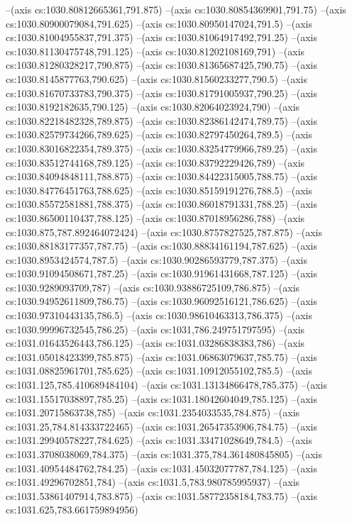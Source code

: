 --(axis cs:1030.80812665361,791.875)
--(axis cs:1030.80854369901,791.75)
--(axis cs:1030.80900079084,791.625)
--(axis cs:1030.80950147024,791.5)
--(axis cs:1030.81004955837,791.375)
--(axis cs:1030.81064917492,791.25)
--(axis cs:1030.81130475748,791.125)
--(axis cs:1030.81202108169,791)
--(axis cs:1030.81280328217,790.875)
--(axis cs:1030.81365687425,790.75)
--(axis cs:1030.8145877763,790.625)
--(axis cs:1030.81560233277,790.5)
--(axis cs:1030.81670733783,790.375)
--(axis cs:1030.81791005937,790.25)
--(axis cs:1030.8192182635,790.125)
--(axis cs:1030.82064023924,790)
--(axis cs:1030.82218482328,789.875)
--(axis cs:1030.82386142474,789.75)
--(axis cs:1030.82579734266,789.625)
--(axis cs:1030.82797450264,789.5)
--(axis cs:1030.83016822354,789.375)
--(axis cs:1030.83254779966,789.25)
--(axis cs:1030.83512744168,789.125)
--(axis cs:1030.83792229426,789)
--(axis cs:1030.84094848111,788.875)
--(axis cs:1030.84422315005,788.75)
--(axis cs:1030.84776451763,788.625)
--(axis cs:1030.85159191276,788.5)
--(axis cs:1030.85572581881,788.375)
--(axis cs:1030.86018791331,788.25)
--(axis cs:1030.86500110437,788.125)
--(axis cs:1030.87018956286,788)
--(axis cs:1030.875,787.892464072424)
--(axis cs:1030.8757827525,787.875)
--(axis cs:1030.88183177357,787.75)
--(axis cs:1030.88834161194,787.625)
--(axis cs:1030.8953424574,787.5)
--(axis cs:1030.90286593779,787.375)
--(axis cs:1030.91094508671,787.25)
--(axis cs:1030.91961431668,787.125)
--(axis cs:1030.9289093709,787)
--(axis cs:1030.93886725109,786.875)
--(axis cs:1030.94952611809,786.75)
--(axis cs:1030.96092516121,786.625)
--(axis cs:1030.97310443135,786.5)
--(axis cs:1030.98610463313,786.375)
--(axis cs:1030.99996732545,786.25)
--(axis cs:1031,786.249751797595)
--(axis cs:1031.01643526443,786.125)
--(axis cs:1031.03286838383,786)
--(axis cs:1031.05018423399,785.875)
--(axis cs:1031.06863079637,785.75)
--(axis cs:1031.08825961701,785.625)
--(axis cs:1031.10912055102,785.5)
--(axis cs:1031.125,785.410689484104)
--(axis cs:1031.13134866478,785.375)
--(axis cs:1031.15517038897,785.25)
--(axis cs:1031.18042604049,785.125)
--(axis cs:1031.20715863738,785)
--(axis cs:1031.2354033535,784.875)
--(axis cs:1031.25,784.814333722465)
--(axis cs:1031.26547353906,784.75)
--(axis cs:1031.29940578227,784.625)
--(axis cs:1031.33471028649,784.5)
--(axis cs:1031.3708038069,784.375)
--(axis cs:1031.375,784.361480845805)
--(axis cs:1031.40954484762,784.25)
--(axis cs:1031.45032077787,784.125)
--(axis cs:1031.49296702851,784)
--(axis cs:1031.5,783.980785995937)
--(axis cs:1031.53861407914,783.875)
--(axis cs:1031.58772358184,783.75)
--(axis cs:1031.625,783.661759894956)
